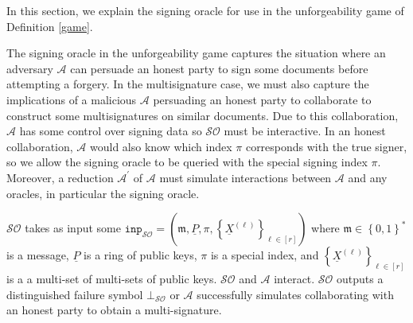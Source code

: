 \documentclass{iacrtrans}
\theoremstyle{definition}
\numberwithin{theorem}{subsection}
\numberwithin{lemma}{theorem}
\newcommand{\adversary}{\mathcal{A}}
\newcommand{\m}{\mathfrak{m}}
\begin{document}
In this section, we explain the signing oracle for use in the unforgeability game of Definition \ref{game}.

The signing oracle in the unforgeability game captures the situation where an adversary $\adversary$ can persuade an honest party to sign some documents before attempting a forgery. In the multisignature case, we must also capture the implications of a malicious $\adversary$ persuading an honest party to collaborate to construct some multisignatures on similar documents. Due to this collaboration, $\adversary$ has some control over signing data so $\mathcal{SO}$ must be interactive.  In an honest collaboration, $\adversary$ would also know which index $\pi$ corresponds with the true signer, so we allow the signing oracle to be queried with the special signing index $\pi$. Moreover, a reduction $\adversary^\prime$ of $\adversary$ must simulate interactions between $\adversary$ and any oracles, in particular the signing oracle.

$\mathcal{SO}$ takes as input some $\texttt{inp}_{\mathcal{SO}} = (\m, \underline{P}, \pi, \left\{\underline{X}^{(\ell)}\right\}_{\ell \in [r]})$ where $\m \in \left\{0,1\right\}^*$ is a message, $\underline{P}$ is a ring of public keys, $\pi$ is a special index, and $\left\{\underline{X}^{(\ell)}\right\}_{\ell \in [r]}$ is a a multi-set of multi-sets of public keys. $\mathcal{SO}$ and $\adversary$ interact. $\mathcal{SO}$ outputs a distinguished failure symbol $\bot_{\mathcal{SO}}$ or $\adversary$ successfully simulates collaborating with an honest party to obtain a multi-signature.
\end{document}
